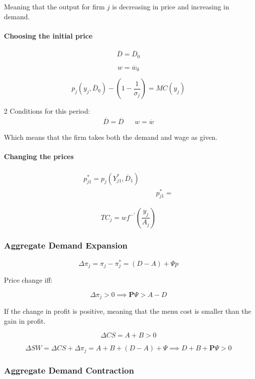 Meaning that the output for firm $j$ is decreasing in price and increasing in demand.

\paragraph{Choosing the initial price}

$$
\overline{D} = \overline{D}_0
$$

$$
w = \overline{w}_0
$$

$$
p_j \left( y_j, \overline{D}_0 \right) - \left( 1 - \frac{1}{\sigma_j}  \right) = MC(y_j) 
$$

2 Conditions for this period:
\begin{align*}
    \overline{D} = \overline{D} && w = \overline{w}
\end{align*}

Which means that the firm takes both the demand and wage as given. 

\paragraph{Changing the prices}

\begin{align*}
    p_{j1}^* = p_j \left( Y_{j1}^*, \overline{D}_1 \right) \\
    &&& p_{j1}^* =
\end{align*}

$$
TC_j = wf^{-'} \left(  \frac{y_j}{A_j}  \right)
$$

\subsubsection{Aggregate Demand Expansion}
$$\Delta \pi _ { j } = \pi_j - \pi^*_j = (D - A) + \Psi p$$

Price change iff:

$$\Delta \pi_j > 0 \implies \mathbf{P} \Psi > A - D$$

If the change in profit is positive, meaning that the menu cost is smaller than the gain in profit.


$$
\Delta CS = A + B > 0
$$

$$
\Delta SW = \Delta CS + \Delta \pi _ { j } = A + B + (D - A) + \Psi \implies
D + B + \mathbf{P} \Psi > 0
$$



\subsubsection{Aggregate Demand Contraction}

